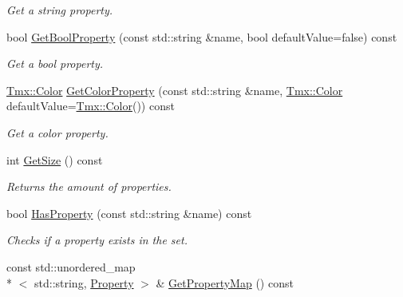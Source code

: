 \begin{DoxyCompactItemize}
\begin{DoxyCompactList}\small\item\em Get a string property. \end{DoxyCompactList}\item 
\hypertarget{classTmx_1_1PropertySet_a0ba8ecdf58e289e2dee57ce38b9df20d}{bool \hyperlink{classTmx_1_1PropertySet_a0ba8ecdf58e289e2dee57ce38b9df20d}{Get\-Bool\-Property} (const std\-::string \&name, bool default\-Value=false) const }\label{classTmx_1_1PropertySet_a0ba8ecdf58e289e2dee57ce38b9df20d}

\begin{DoxyCompactList}\small\item\em Get a bool property. \end{DoxyCompactList}\item 
\hypertarget{classTmx_1_1PropertySet_a02fb8f1bc34d169cc5a8fd148360c915}{\hyperlink{classTmx_1_1Color}{Tmx\-::\-Color} \hyperlink{classTmx_1_1PropertySet_a02fb8f1bc34d169cc5a8fd148360c915}{Get\-Color\-Property} (const std\-::string \&name, \hyperlink{classTmx_1_1Color}{Tmx\-::\-Color} default\-Value=\hyperlink{classTmx_1_1Color}{Tmx\-::\-Color}()) const }\label{classTmx_1_1PropertySet_a02fb8f1bc34d169cc5a8fd148360c915}

\begin{DoxyCompactList}\small\item\em Get a color property. \end{DoxyCompactList}\item 
\hypertarget{classTmx_1_1PropertySet_a67b47b4e15e8df963911c798f792a2cc}{int \hyperlink{classTmx_1_1PropertySet_a67b47b4e15e8df963911c798f792a2cc}{Get\-Size} () const }\label{classTmx_1_1PropertySet_a67b47b4e15e8df963911c798f792a2cc}

\begin{DoxyCompactList}\small\item\em Returns the amount of properties. \end{DoxyCompactList}\item 
\hypertarget{classTmx_1_1PropertySet_a9581ebb5a9683662887151f1e92b664a}{bool \hyperlink{classTmx_1_1PropertySet_a9581ebb5a9683662887151f1e92b664a}{Has\-Property} (const std\-::string \&name) const }\label{classTmx_1_1PropertySet_a9581ebb5a9683662887151f1e92b664a}

\begin{DoxyCompactList}\small\item\em Checks if a property exists in the set. \end{DoxyCompactList}\item 
\hypertarget{classTmx_1_1PropertySet_a459999829fc14e72decdd60e378d0531}{const std\-::unordered\-\_\-map\\*
$<$ std\-::string, \hyperlink{classTmx_1_1Property}{Property} $>$ \& \hyperlink{classTmx_1_1PropertySet_a459999829fc14e72decdd60e378d0531}{Get\-Property\-Map} () const }\label{classTmx_1_1PropertySet_a459999829fc14e72decdd60e378d0531}


\end{DoxyCompactItemize}
